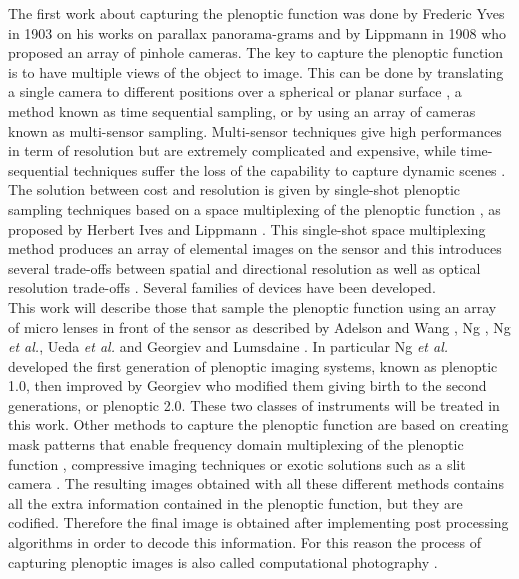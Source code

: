  The first work about capturing the plenoptic function was done by Frederic Yves in 1903 \cite{ives1903parallax} on his works on parallax panorama-grams and by Lippmann in 1908 \cite{gabriel1908photographie} who proposed an array of pinhole cameras. The key to capture the plenoptic function is to have multiple views of the object to image. This can be done by translating a single camera to different positions over a spherical or planar surface \cite{levoy1996light,taguchi2010axial,gortler1996lumigraph,barb1997novel}, a method known as time sequential sampling, or by using an array of cameras \cite{wilburn2001light,yang2002real,nomura2007scene} known as multi-sensor sampling. Multi-sensor techniques give high performances in term of resolution but are extremely complicated and expensive, while time-sequential techniques suffer the loss of the capability to capture dynamic scenes \cite{wetzstein2011computational}. The solution between cost and resolution is given by single-shot plenoptic sampling techniques based on a space multiplexing of the plenoptic function \cite{wetzstein2011computational}, as proposed by Herbert Ives \cite{ives1930parallax} and Lippmann \cite{gabriel1908photographie}. This single-shot space multiplexing method produces an array of elemental images on the sensor and this introduces several trade-offs between spatial and directional resolution \cite{wetzstein2011computational,georgiev2006spatio} as well as optical resolution trade-offs \cite{turola2014wave}. Several families of devices have been developed.\\ This work will describe those that sample the plenoptic function using an array of micro lenses in front of the sensor as described by Adelson and Wang \cite{adelson1992single}, Ng \cite{ng2005light}, Ng \textit{et al.}\cite{ng2006digital}, Ueda \textit{et al.} \cite{ueda2008adaptive} and Georgiev and Lumsdaine \cite{georgiev2010focused}. In particular Ng \textit{et al.} developed the first generation of plenoptic imaging systems, known as plenoptic 1.0, then improved by Georgiev who modified them giving birth to the second generations, or plenoptic 2.0. These two classes of instruments will be treated in this work. Other methods to capture the plenoptic function are based on creating mask patterns that enable frequency domain multiplexing of the plenoptic function \cite{veeraraghavan2007dappled,lanman2008shield}, compressive imaging techniques \cite{marwah2013compressive} or exotic solutions such as a slit camera \cite{ji2015depth}. The resulting images obtained with all these different methods contains all the extra information contained in the plenoptic function, but they are codified. Therefore the final image is obtained after implementing post processing algorithms in order to decode this information. For this reason the process of capturing plenoptic images is also called computational photography \cite{wetzstein2011computational,nayar2006computational}.\\ 
